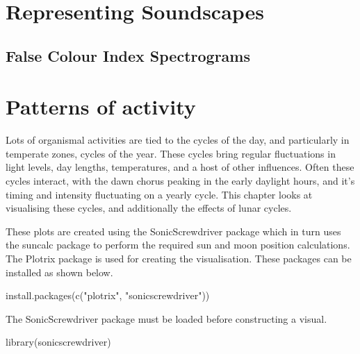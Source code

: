 \documentclass[
]{book}
\newenvironment{Shaded}{\begin{snugshade}}{\end{snugshade}}
\newcommand{\FunctionTok}[1]{\textcolor[rgb]{0.00,0.00,0.00}{#1}}
\newcommand{\NormalTok}[1]{#1}
\newcommand{\StringTok}[1]{\textcolor[rgb]{0.31,0.60,0.02}{#1}}
\begin{document}
\hypertarget{representing-soundscapes}{%
\chapter{Representing Soundscapes}\label{representing-soundscapes}}

\hypertarget{false-colour-index-spectrograms}{%
\section{False Colour Index Spectrograms}\label{false-colour-index-spectrograms}}

\hypertarget{patterns-of-activity}{%
\chapter{Patterns of activity}\label{patterns-of-activity}}

Lots of organismal activities are tied to the cycles of the day, and particularly in temperate zones, cycles of the year. These cycles bring regular fluctuations in light levels, day lengths, temperatures, and a host of other influences. Often these cycles interact, with the dawn chorus peaking in the early daylight hours, and it's timing and intensity fluctuating on a yearly cycle. This chapter looks at visualising these cycles, and additionally the effects of lunar cycles.

These plots are created using the SonicScrewdriver package \citep{sonicscrewdriver} which in turn uses the suncalc package \citep{suncalc} to perform the required sun and moon position calculations. The Plotrix package \citep{plotrix} is used for creating the visualisation. These packages can be installed as shown below.

\begin{Shaded}
\begin{Highlighting}[]
\FunctionTok{install.packages}\NormalTok{(}\FunctionTok{c}\NormalTok{(}\StringTok{"plotrix"}\NormalTok{, }\StringTok{"sonicscrewdriver"}\NormalTok{))}
\end{Highlighting}
\end{Shaded}

The SonicScrewdriver package must be loaded before constructing a visual.

\begin{Shaded}
\begin{Highlighting}[]
\FunctionTok{library}\NormalTok{(sonicscrewdriver)}
\end{Highlighting}
\end{Shaded}
\end{document}
